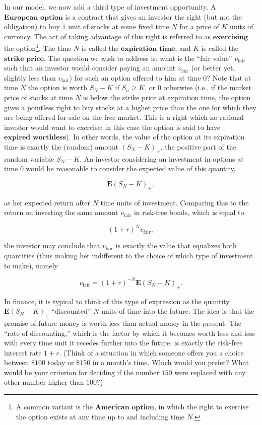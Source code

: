 \documentclass[11pt]{report}
\theoremstyle{plain}
\theoremstyle{definition}
\begin{document}
In our model, we now add a third type of investment opportunity. A $\textbf{European option}$ is a contract that gives an investor the right (but not the obligation) to buy $1$ unit of stocks at some fixed time $N$ for a price of $K$ units of currency. The act of taking advantage of this right is referred to as $\textbf{exercising}$ the option\footnote{A common variant is the $\textbf{American option}$, in which the right to exercise the option exists at any time up to and including time $N$.}. The time $N$ is called the $\textbf{expiration time}$, and $K$ is called the $\textbf{strike price}$. The question we wish to address is: what is the ``fair value'' $v_\textrm{fair}$ such that an investor would consider paying an amount $v_\textrm{fair}$ (or better yet, slightly less than $v_\textrm{fair}$) for such an option offered to him at time $0$? Note that at time $N$ the option is worth $S_N-K$ if $S_n\ge K$, or $0$ otherwise (i.e., if the market price of stocks at time $N$ is below the strike price at expiration time, the option gives a pointless right to buy stocks at a higher price than the one for which they are being offered for sale on the free market. This is a right which no rational investor would want to exercise; in this case the option is said to have $\textbf{expired worthless}$). In other words, the value of the option at its expiration time is exactly the (random) amount $(S_N-K)_+$, the positive part of the random variable $S_N-K$. An investor considering an investment in options at time $0$ would be reasonable to consider the expected value of this quantity,

\[
\mathbf{E}(S_N-K)_+,
\]

as her expected return after $N$ time units of investment. Comparing this to the return on investing the same amount $v_\textrm{fair}$ in risk-free bonds, which is equal to

\[
(1+r)^N v_\textrm{fair},
\]

the investor may conclude that $v_\textrm{fair}$ is exactly the value that equalizes both quantities (thus making her indifferent to the choice of which type of investment to make), namely

\begin{equation*} \tag{11}\label{eq:discrete-black-scholes}
v_\textrm{fair} = (1+r)^{-N} \mathbf{E}(S_N-K)_+.
\end{equation*}

In finance, it is typical to think of this type of expression as the quantity $\mathbf{E}(S_N-K)_+$ ``discounted'' $N$ units of time into the future. The idea is that the promise of future money is worth less than actual money in the present. The ``rate of discounting,'' which is the factor by which it becomes worth less and less with every time unit it recedes further into the future, is exactly the risk-free interest rate $1+r$. (Think of a situation in which someone offers you a choice between \(\$100\) today or \(\$150\) in a month's time. Which would you prefer? What would be your criterion for deciding if the number $150$ were replaced with any other number higher than $100$?)
\end{document}
